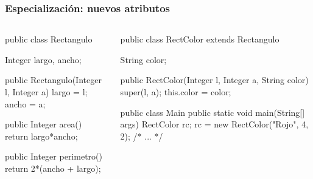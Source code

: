 \documentclass{beamer}
\begin{document}
\begin{frame}[fragile]
  \frametitle{Especialización: nuevos atributos}

     \begin{columns}
       \begin{column}{0.45\textwidth}
         \begin{jsmall}
           public class Rectangulo {
             Integer largo, ancho;

             public Rectangulo(Integer l,
                               Integer a) {
              largo = l;
              ancho = a;                               
             }

             public Integer area() {
               return largo*ancho;
             }

             public Integer perimetro() {
               return 2*(ancho + largo);
             }
           }           
         \end{jsmall}
     \end{column}
    \begin{column}{0.55\textwidth}      
      \begin{jsmall}
        public class RectColor
        extends Rectangulo {
          String color;

          public RectColor(Integer l,
                           Integer a,
                           String color) {
              super(l, a);
              this.color = color;                                   
          }
        }

        public class Main {
          public static
          void main(String[] args) {
            RectColor rc;
            rc = new RectColor("Rojo", 4, 2);
            /* ... */
          }
        }
      \end{jsmall}      
    \end{column}
  \end{columns}  
\end{frame}
\end{document}
